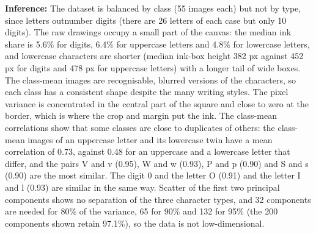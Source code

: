 \documentclass[12pt,a4paper]{article}
\begin{document}
\textbf{Inference:} The dataset is balanced by class (55 images each) but not by type, since letters
outnumber digits (there are 26 letters of each case but only 10 digits). The raw drawings occupy a small part of the
canvas: the median ink share is 5.6\% for digits, 6.4\% for uppercase letters and 4.8\% for lowercase letters,
and lowercase characters are shorter (median ink-box height 382 px against 452 px for digits and 478 px for
uppercase letters) with a longer tail of wide boxes. The class-mean images are recognisable, blurred versions of
the characters, so each class has a consistent shape despite the many writing styles. The pixel variance is
concentrated in the central part of the square and close to zero at the border, which is where the crop and
margin put the ink. The class-mean correlations show that some classes are close to duplicates of others: the
class-mean images of an uppercase letter and its lowercase twin have a mean correlation of 0.73, against 0.48
for an uppercase and a lowercase letter that differ, and the pairs V and v (0.95), W and w (0.93), P and p
(0.90) and S and s (0.90) are the most similar. The digit 0 and the letter O (0.91) and the letter I and l
(0.93) are similar in the same way. Scatter of the first two principal components shows no separation of
the three character types, and 32 components are needed for 80\% of the variance, 65 for 90\% and 132 for
95\% (the 200 components shown retain 97.1\%), so the data is not low-dimensional.
\end{document}
